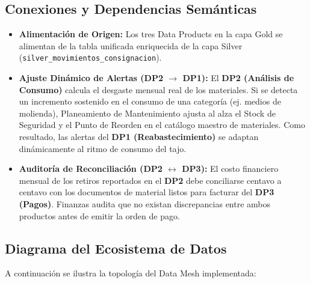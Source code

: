 \documentclass[11pt,a4paper]{article}
\begin{document}
\subsection{Conexiones y Dependencias Semánticas}
\begin{itemize}
    \item \textbf{Alimentación de Origen:} Los tres Data Products en la capa Gold se alimentan de la tabla unificada enriquecida de la capa Silver (\texttt{silver\_movimientos\_consignacion}).
    \item \textbf{Ajuste Dinámico de Alertas (DP2 $\rightarrow$ DP1):} El \textbf{DP2 (Análisis de Consumo)} calcula el desgaste mensual real de los materiales. Si se detecta un incremento sostenido en el consumo de una categoría (ej. medios de molienda), Planeamiento de Mantenimiento ajusta al alza el Stock de Seguridad y el Punto de Reorden en el catálogo maestro de materiales. Como resultado, las alertas del \textbf{DP1 (Reabastecimiento)} se adaptan dinámicamente al ritmo de consumo del tajo.
    \item \textbf{Auditoría de Reconciliación (DP2 $\leftrightarrow$ DP3):} El costo financiero mensual de los retiros reportados en el \textbf{DP2} debe conciliarse centavo a centavo con los documentos de material listos para facturar del \textbf{DP3 (Pagos)}. Finanzas audita que no existan discrepancias entre ambos productos antes de emitir la orden de pago.
\end{itemize}

\subsection{Diagrama del Ecosistema de Datos}
A continuación se ilustra la topología del Data Mesh implementada:
\end{document}
